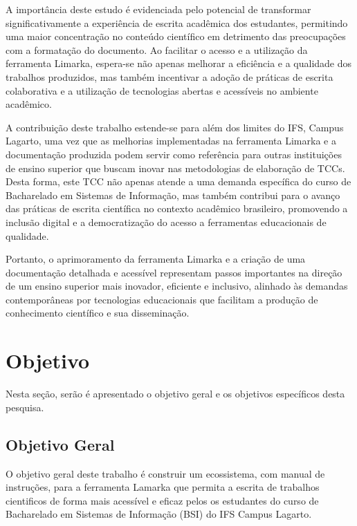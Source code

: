 \documentclass[
	12pt,				%
	oneside,			%
	a4paper,			%
	english,			%
	french,				%
	spanish,			%
	brazil				%
	]{abntex2}
\begin{document}
A importância deste estudo é evidenciada pelo potencial de transformar
significativamente a experiência de escrita acadêmica dos estudantes,
permitindo uma maior concentração no conteúdo científico em detrimento
das preocupações com a formatação do documento. Ao facilitar o acesso e
a utilização da ferramenta Limarka, espera-se não apenas melhorar a
eficiência e a qualidade dos trabalhos produzidos, mas também incentivar
a adoção de práticas de escrita colaborativa e a utilização de
tecnologias abertas e acessíveis no ambiente acadêmico.

A contribuição deste trabalho estende-se para além dos limites do IFS,
Campus Lagarto, uma vez que as melhorias implementadas na ferramenta
Limarka e a documentação produzida podem servir como referência para
outras instituições de ensino superior que buscam inovar nas
metodologias de elaboração de TCCs. Desta forma, este TCC não apenas
atende a uma demanda específica do curso de Bacharelado em Sistemas de
Informação, mas também contribui para o avanço das práticas de escrita
científica no contexto acadêmico brasileiro, promovendo a inclusão
digital e a democratização do acesso a ferramentas educacionais de
qualidade.

Portanto, o aprimoramento da ferramenta Limarka e a criação de uma
documentação detalhada e acessível representam passos importantes na
direção de um ensino superior mais inovador, eficiente e inclusivo,
alinhado às demandas contemporâneas por tecnologias educacionais que
facilitam a produção de conhecimento científico e sua disseminação.

\hypertarget{objetivo}{%
\chapter{Objetivo}\label{objetivo}}

Nesta seção, serão é apresentado o objetivo geral e os objetivos
específicos desta pesquisa.

\hypertarget{objetivo-geral}{%
\section{Objetivo Geral}\label{objetivo-geral}}

O objetivo geral deste trabalho é construir um ecossistema, com manual
de instruções, para a ferramenta Lamarka que permita a escrita de
trabalhos cientificos de forma mais acessível e eficaz pelos os
estudantes do curso de Bacharelado em Sistemas de Informação (BSI) do
IFS Campus Lagarto.
\end{document}
